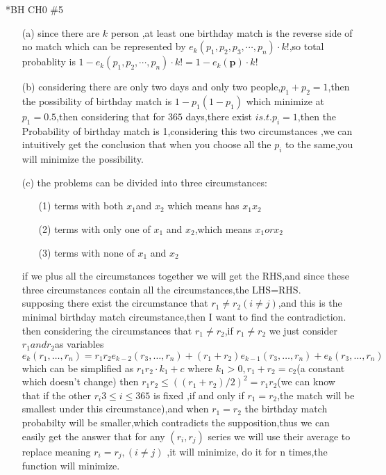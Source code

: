 \documentclass{article}
\begin{document}
\begin{homeworkProblem}*{BH CH0 \#5}
	\begin{enumerate}
		\item[(a)] since there are $k$ person ,at least one birthday match is the reverse side of no match which can be represented by $e_k(p_1,p_2,p_3,\cdots,p_n)\cdot k!$,so total probablity is $1-e_k(p_1,p_2,\cdots,p_n)\cdot k!=1-e_k(\textbf{p})\cdot k!$
		\item[(b)]  considering there are only two days and only two people,$p_1+p_2=1$,then the possibility of birthday match is $1-p_1(1-p_1)$ which minimize at $p_1=0.5$,then considering that for $365$ days,there exist $i s.t. p_i=1$,then the Probability of  birthday match is 1,considering this two circumstances ,we can intuitively get the conclusion that when you choose all the $p_i$ to the same,you will minimize the possibility.
		\item[(c)]  the problems can be divided into three circumstances:
		\begin{enumerate}
			\item[(1)] terms with both $x_1$and $x_2$ which means has $x_1x_2$
			\item[(2)] terms with only one of $x_1$ and $x_2$,which means $x_1 or x_2$
			\item[(3)] terms with none of $x_1$ and $x_2$
		   
		\end{enumerate}
		if we plus all the circumstances together we will get the RHS,and since these three circumstances contain all the circumstances,the LHS=RHS.
		\\ supposing there exist the circumstance that $r_1\neq r_2(i\neq j)$,and this is the minimal birthday match circumstance,then I want to find the contradiction. \\
		then considering the circumstances that $r_1\neq r_2$,if $r_1\neq r_2$ we just consider $r_1 and r_2 $as variables $e_k\left(r_1, \ldots, r_n\right)=r_1 r_2 e_{k-2}\left(r_3, \ldots, r_n\right)+\left(r_1+r_2\right) e_{k-1}\left(r_3, \ldots, r_n\right)+e_k\left(r_3, \ldots, r_n\right)$
		which can be simplified as $r_1r_2 \cdot k_1+c$ where $k_1>0,r_1+r_2=c_2$(a constant which doesn't change) then $r_1 r_2 \leq\left(\left(r_1+r_2\right) / 2\right)^2=r_1 r_2$(we can know that if the other $r_i 3\leq i\leq 365$ is fixed ,if and only if $r_1=r_2$,the match will be smallest under this circumstance),and when $r_1=r_2$ the birthday match probabilty will be smaller,which contradicts the supposition,thus we can easily get the answer that for any $(r_i,r_j)$ series we will use their average to replace meaning $r_i=r_j,(i\neq j)$ ,it will minimize, do it for n times,the function will minimize.
	\end{enumerate}
\end{homeworkProblem}
\end{document}
